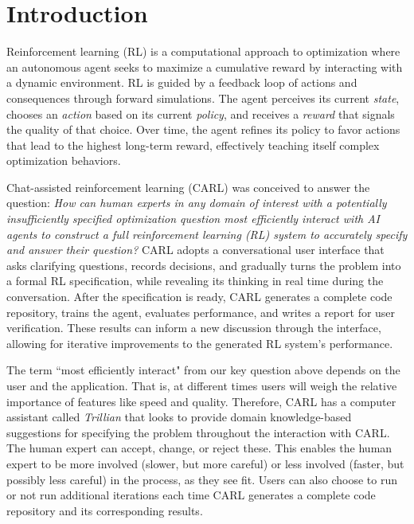 \documentclass[mnsc,sglanonrev]{informs4}
\begin{document}
\maketitle


\section{Introduction}
\label{sec:introduction}
Reinforcement learning (RL) is a computational approach to optimization where an autonomous agent seeks to maximize a cumulative reward by interacting with a dynamic environment. RL is guided by a feedback loop of actions and consequences through forward simulations. The agent perceives its current {\it state}, chooses an {\it action} based on its current {\it policy}, and receives a {\it reward} that signals the quality of that choice. Over time, the agent refines its policy to favor actions that lead to the highest long-term reward, effectively teaching itself complex optimization behaviors.

Chat-assisted reinforcement learning (CARL) was conceived to answer the question: \emph{How can human experts in any domain of interest with a potentially insufficiently specified optimization question most efficiently interact with AI agents to construct a full reinforcement learning (RL) system to accurately specify and answer their question?}  
CARL adopts a conversational user interface that asks clarifying questions, records decisions, and gradually turns the problem into a formal RL specification, while revealing its thinking in real time during the conversation.  After the specification is ready, CARL generates a complete code repository, trains the agent,  evaluates performance, and writes a report for user verification. These results can inform a new discussion through the interface, allowing for iterative improvements to the generated RL system's performance. 

The term ``most efficiently interact" from our key question above depends on the user and the application. That is, at different times users will weigh the relative importance of features like speed and quality. Therefore, CARL has a computer assistant called \emph{Trillian} that looks to provide domain knowledge-based suggestions for specifying the problem throughout the interaction with CARL. The human expert can accept, change, or reject these. This enables the human expert to be more involved (slower, but more careful) or less involved (faster, but possibly less careful) in the process, as they see fit. Users can also choose to run or not run additional iterations each time CARL generates a complete code repository and its corresponding results.
\end{document}
